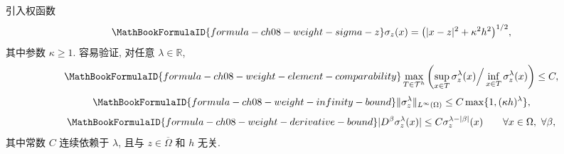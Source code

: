 引入权函数
\[
\MathBookFormulaID{formula-ch08-weight-sigma-z}
\sigma_z(x)=\bigl(|x-z|^2+\kappa^2h^2\bigr)^{1/2},
\]
其中参数 $\kappa\geq1$. 容易验证, 对任意 $\lambda\in\mathbb R$,
\begin{equation}
\MathBookFormulaID{formula-ch08-weight-element-comparability}
\label{eq:ch08-weight-element-comparability}
\max_{T\in\mathcal T^h}
\left(\sup_{x\in T}\sigma_z^\lambda(x)\Big/\inf_{x\in T}\sigma_z^\lambda(x)\right)\leq C,
\end{equation}
\begin{equation}
\MathBookFormulaID{formula-ch08-weight-infinity-bound}
\label{eq:ch08-weight-infinity-bound}
\|\sigma_z^\lambda\|_{L^\infty(\Omega)}\leq C\max\{1,(\kappa h)^\lambda\},
\end{equation}
\begin{equation}
\MathBookFormulaID{formula-ch08-weight-derivative-bound}
\label{eq:ch08-weight-derivative-bound}
|D^\beta\sigma_z^\lambda(x)|\leq C\sigma_z^{\lambda-|\beta|}(x)
\qquad\forall x\in\Omega,\ \forall\beta,
\end{equation}
其中常数 $C$ 连续依赖于 $\lambda$, 且与 $z\in\overline\Omega$ 和 $h$ 无关.

